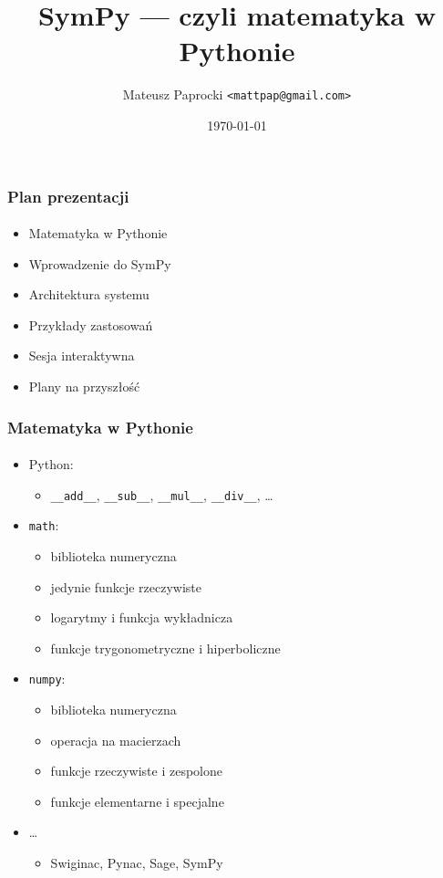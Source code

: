 \documentclass[10pt]{beamer}
\title{SymPy --- czyli matematyka w Pythonie}
\author{Mateusz Paprocki \texttt{<mattpap@gmail.com>}}
\institute{Wrocław University of Technology \\ University of Nevada, Reno}
\date{\today}
\begin{document}
\begin{frame}[plain,t]
    \maketitle
\end{frame}

\begin{frame}
    \frametitle{Plan prezentacji}
    \framesubtitle{}

    \begin{itemize}
        \item Matematyka w Pythonie
        \item Wprowadzenie do SymPy
        \item Architektura systemu
        \item Przykłady zastosowań
        \item Sesja interaktywna
        \item Plany na przyszłość
    \end{itemize}
\end{frame}

\begin{frame}[fragile]
    \frametitle{Matematyka w Pythonie}
    \framesubtitle{}

    \begin{itemize}
        \item Python:
            \begin{itemize}
                \item \verb+__add__+, \verb+__sub__+, \verb+__mul__+, \verb+__div__+, \ldots
            \end{itemize}
        \pause
        \item \texttt{math}:
            \begin{itemize}
                \item biblioteka numeryczna
                \item jedynie funkcje rzeczywiste
                \item logarytmy i funkcja wykładnicza
                \item funkcje trygonometryczne i hiperboliczne
            \end{itemize}
        \pause
        \item \texttt{numpy}:
            \begin{itemize}
                \item biblioteka numeryczna
                \item operacja na macierzach
                \item funkcje rzeczywiste i zespolone
                \item funkcje elementarne i specjalne
            \end{itemize}
        \pause
        \item \ldots
            \begin{itemize}
                \item Swiginac, Pynac, Sage, SymPy
            \end{itemize}
    \end{itemize}
\end{frame}
\end{document}
